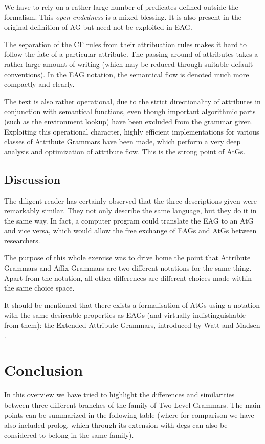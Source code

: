 We have to rely on a rather large number of predicates defined outside
the formalism. This {\em open-endedness} is a mixed blessing. It
is also present in the original definition of AG \cite{koster:afg}
but need not be exploited in EAG.

The separation of the CF rules from their attribuation rules
makes it hard to follow the fate of a particular attribute.
The passing around of attributes takes a
rather large amount of writing (which may be reduced through suitable
default conventions). In the EAG notation, the semantical flow is denoted
much more compactly and clearly.

The text is also rather operational, due to the strict directionality of
attributes in conjunction with semantical functions, even though important
algorithmic parts (such as the environment lookup)
have been excluded from the grammar given.
Exploiting this operational character, highly efficient implementations
for various classes of Attribute Grammars have been made, which perform
a very deep analysis and optimization of attribute flow. This is the
strong point of AtGs.

\subsection{Discussion}
The diligent reader has certainly observed that the three descriptions
given were remarkably similar. They not only describe the same language,
but they do it in the same way. In fact, a computer program could
translate the EAG to an AtG and vice versa, which would allow the free
exchange of EAGs and AtGs between researchers.

The purpose of this whole exercise was to drive home the point that
Attribute Grammars and Affix Grammars are two different notations
for the same thing. Apart from the notation, all other differences
are different choices made within the same choice space.

It should be mentioned that there exists a formalisation of AtGs
using a notation with the same desireable properties as EAGs (and
virtually indistinguishable from them):
the Extended Attribute Grammars, introduced by Watt and Madsen
\cite{watt:eatg}.
\section{Conclusion}
In this overview we have tried to highlight the differences and
similarities between three different branches of the family of
Two-Level Grammars.
The main points can
be summarized in the following table (where for comparison we have also
included {\sc prolog}, which through its extension with {\sc dcg}s can also be considered
to belong in the same family).
\vspace{.5cm}

